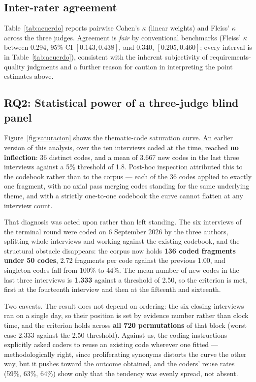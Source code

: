 \documentclass{llncs}
\begin{document}
\subsection{Inter-rater agreement}

Table~\ref{tab:acuerdo} reports pairwise Cohen's $\kappa$ (linear weights) and Fleiss'
$\kappa$ across the three judges. Agreement is \emph{fair} by conventional benchmarks
(Fleiss' $\kappa$ between 0.294, 95\% CI $[0.143, 0.438]$, and 0.340, $[0.205, 0.460]$;
every interval is in Table~\ref{tab:acuerdo}), consistent with the
inherent subjectivity of requirements-quality judgments and a further reason for
caution in interpreting the point estimates above.



\subsection{RQ2: Statistical power of a three-judge blind panel}

Figure~\ref{fig:saturacion} shows the thematic-code saturation curve. An earlier version
of this analysis, over the ten interviews coded at the time, reached \textbf{no
inflection}: 36 distinct codes, and a mean of 3.667 new codes in the last three
interviews against a 5\% threshold of 1.8. Post-hoc inspection attributed this to the
codebook rather than to the corpus --- each of the 36 codes applied to exactly one
fragment, with no axial pass merging codes standing for the same underlying theme, and
with a strictly one-to-one codebook the curve cannot flatten at any interview count.

That diagnosis was acted upon rather than left standing. The six interviews of the
terminal round were coded on 6 September 2026 by the three authors, splitting whole
interviews and working against the existing codebook, and the structural obstacle
disappears: the corpus now holds \textbf{136 coded fragments under 50 codes}, 2.72
fragments per code against the previous 1.00, and singleton codes fall from 100\% to
44\%. The mean number of new codes in the last three interviews is \textbf{1.333}
against a threshold of 2.50, so the criterion is met, first at the fourteenth interview
and then at the fifteenth and sixteenth.

Two caveats. The result does not depend on ordering: the six closing interviews ran on a
single day, so their position is set by evidence number rather than clock time, and the
criterion holds across \textbf{all 720 permutations} of that block (worst case 2.333
against the 2.50 threshold). Against us, the coding instructions explicitly asked coders
to reuse an existing code wherever one fitted --- methodologically right, since
proliferating synonyms distorts the curve the other way, but it pushes toward the outcome
obtained, and the coders' reuse rates (59\%, 63\%, 64\%) show only that the tendency was
evenly spread, not absent.
\end{document}

